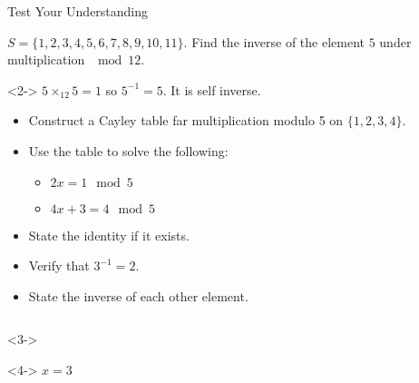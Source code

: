 \documentclass[8pt]{beamer}
\begin{document}
\begin{frame}[shrink=20]{Test Your Understanding}
	\begin{problem}
		$S=\{1,2,3,4,5,6,7,8,9,10,11\}$. Find the inverse of the element  $5$ under multiplication  $\mod 12$.
	\end{problem}
	\begin{solution}<2->
		$5\times_{12} 5=1 $ so $ 5^{-1}=5$. It is self inverse.
	\end{solution}
	\begin{problem}
		\begin{itemize}
			\item Construct a Cayley table far multiplication modulo 5 on $\{1,2,3,4\}.$
			\item Use the table to solve the following:
				 \begin{itemize}
					\item $2x=1 \mod 5$
					\item  $4x+3=4 \mod 5$
				\end{itemize}
			\item State the identity if it exists.
			\item Verify that $3^{-1}=2$.
			\item State the inverse of each other element.
		\end{itemize}
	
	\end{problem}

		\begin{columns}[T]
			\begin{column}{.5\linewidth}
					\begin{solution}<3->
	\centering

\end{solution}
\begin{solution}<4->
	$x=3$
\end{solution}
			\end{column}
	\begin{column}{.5\linewidth}


\end{column}
\end{columns}
\end{frame}
\end{document}
